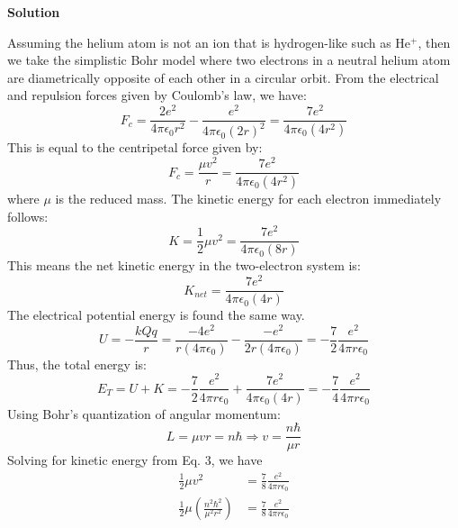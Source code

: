 \documentclass[12pt]{article}
\begin{document}
\setcounter{equation}{0}
\vspace{0.5cm}
\begin{adjustwidth}{2.5em}{0pt}
\begin{siderules}
 {\color{blue} \textbf{Solution}
 
Assuming the helium atom is not an ion that is hydrogen-like such as He$^{+}$, then we take the simplistic Bohr model where two electrons in a neutral helium atom are diametrically opposite of each other in a circular orbit. From the electrical and repulsion forces given by Coulomb's law, we have:
\begin{equation}
F_c = \frac{2e^2}{4\pi \epsilon_0 r^2} - \frac{e^2}{4\pi \epsilon_0(2r)^2} = \frac{7e^2}{4\pi \epsilon_0(4r^2)}
\end{equation}
This is equal to the centripetal force given by:
\begin{equation}
F_c = \frac{\mu v^2}{r} = \frac{7e^2}{4\pi \epsilon_0(4r^2)}
\end{equation}
where $\mu$ is the reduced mass. The kinetic energy for each electron immediately follows:
\begin{equation}
K = \frac{1}{2}\mu v^2 = \frac{7e^2}{4\pi \epsilon_0(8r)}
\end{equation}
This means the net kinetic energy in the two-electron system is:
\begin{equation}
K_{net} = \frac{7e^2}{4\pi \epsilon_0(4r)}
\end{equation}
The electrical potential energy is found the same way.
\begin{equation}
U = -\frac{kQq}{r} = \frac{-4e^2}{r(4\pi\epsilon_0)} - \frac{-e^2}{2r(4\pi\epsilon_0)} = -\frac{7}{2}\frac{e^2}{4\pi r\epsilon_0}
\end{equation}
Thus, the total energy is:
\begin{equation}
E_T = U + K = -\frac{7}{2}\frac{e^2}{4\pi r\epsilon_0} + \frac{7e^2}{4\pi \epsilon_0(4r)} = -\frac{7}{4}\frac{e^2}{4\pi r\epsilon_0}
\end{equation}
Using Bohr's quantization of angular momentum:
\begin{equation}
L = \mu vr = n\hbar \Rightarrow v = \frac{n\hbar}{\mu r}
\end{equation}
Solving for kinetic energy from Eq. 3, we have
\begin{equation}
\begin{aligned}
\frac{1}{2}\mu v^2 &= \frac{7}{8} \frac{e^2}{4\pi r \epsilon_0} \\
\frac{1}{2}\mu \left( \frac{n^2\hbar^2}{\mu^2 r^2}\right) &= \frac{7}{8} \frac{e^2}{4\pi r \epsilon_0} \\

\end{aligned}
\end{equation}}
\end{siderules}
\end{adjustwidth}
\end{document}
